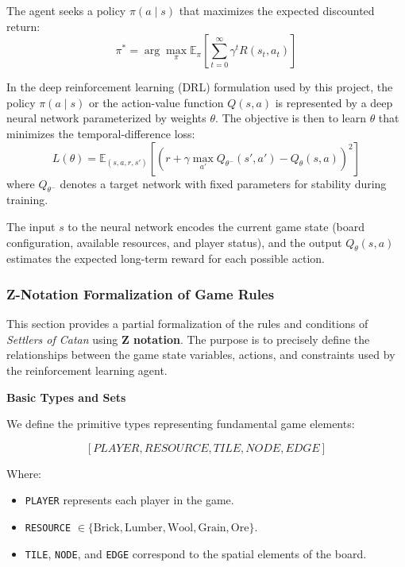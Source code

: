 \documentclass{article}
\begin{document}
The agent seeks a policy $\pi(a \mid s)$ that maximizes the expected discounted return:
\[
\pi^* = \arg\max_{\pi} \mathbb{E}_{\pi}\left[\sum_{t=0}^{\infty} \gamma^t R(s_t, a_t)\right]
\]

In the deep reinforcement learning (DRL) formulation used by this project, the policy $\pi(a \mid s)$ or the action-value function $Q(s, a)$ is represented by a deep neural network parameterized by weights $\theta$. The objective is then to learn $\theta$ that minimizes the temporal-difference loss:
\[
L(\theta) = \mathbb{E}_{(s, a, r, s')} \left[ \left( r + \gamma \max_{a'} Q_{\theta^-}(s', a') - Q_{\theta}(s, a) \right)^2 \right]
\]
where $Q_{\theta^-}$ denotes a target network with fixed parameters for stability during training.

The input $s$ to the neural network encodes the current game state (board configuration, available resources, and player status), and the output $Q_{\theta}(s, a)$ estimates the expected long-term reward for each possible action.

\subsubsection{Z-Notation Formalization of Game Rules}
\label{sec:math-formalization}

This section provides a partial formalization of the rules and conditions of \textit{Settlers of Catan} using \textbf{Z notation}.
The purpose is to precisely define the relationships between the game state variables, actions, and constraints used by the reinforcement learning agent. \newline

\textbf{Basic Types and Sets}

We define the primitive types representing fundamental game elements:

\[
[PLAYER, RESOURCE, TILE, NODE, EDGE]
\]

Where:
\begin{itemize}
    \item \texttt{PLAYER} represents each player in the game.
    \item \texttt{RESOURCE} $\in \{\text{Brick}, \text{Lumber}, \text{Wool}, \text{Grain}, \text{Ore}\}$.
    \item \texttt{TILE}, \texttt{NODE}, and \texttt{EDGE} correspond to the spatial elements of the board. \newline
\end{itemize}
\end{document}
